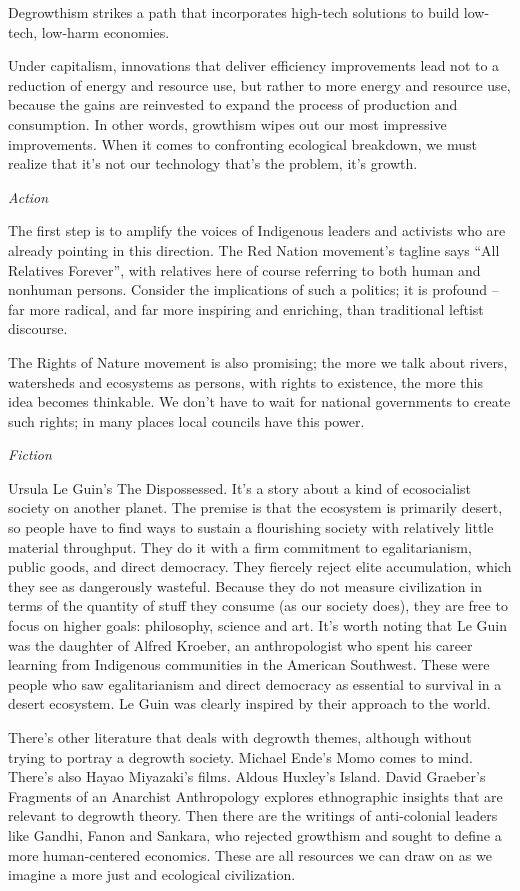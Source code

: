 \documentclass[
]{book}
\begin{document}
Degrowthism strikes a path that incorporates high-tech solutions
to build low-tech, low-harm economies.

Under capitalism, innovations that deliver efficiency improvements lead not to a reduction of energy and resource use, but rather to more energy and resource use, because the gains are reinvested to expand the process of production and consumption. In other words, growthism wipes out our most impressive improvements. When it comes to confronting ecological breakdown, we must realize that it's not our technology that's the problem, it's growth.

\emph{Action}

The first step is to amplify the voices of Indigenous leaders and activists who are already pointing in this direction. The Red Nation movement's tagline says ``All Relatives Forever'', with relatives here of course referring to both human and nonhuman persons. Consider the implications of such a politics; it is profound -- far more radical, and far more inspiring and enriching, than traditional leftist discourse.

The Rights of Nature movement is also promising; the more we talk about rivers, watersheds and ecosystems as persons, with rights to existence, the more this idea becomes thinkable. We don't have to wait for national governments to create such rights; in many places local councils have this power.

\emph{Fiction}

Ursula Le Guin's The Dispossessed. It's a story about a kind of ecosocialist society on another planet. The premise is that the ecosystem is primarily desert, so people have to find ways to sustain a flourishing society with relatively little material throughput. They do it with a firm commitment to egalitarianism, public goods, and direct democracy. They fiercely reject elite accumulation, which they see as dangerously wasteful. Because they do not measure civilization in terms of the quantity of stuff they consume (as our society does), they are free to focus on higher goals: philosophy, science and art. It's worth noting that Le Guin was the daughter of Alfred Kroeber, an anthropologist who spent his career learning from Indigenous communities in the American Southwest. These were people who saw egalitarianism and direct democracy as essential to survival in a desert ecosystem. Le Guin was clearly inspired by their approach to the world.

There's other literature that deals with degrowth themes, although without trying to portray a degrowth society. Michael Ende's Momo comes to mind. There's also Hayao Miyazaki's films. Aldous Huxley's Island. David Graeber's Fragments of an Anarchist Anthropology explores ethnographic insights that are relevant to degrowth theory. Then there are the writings of anti-colonial leaders like Gandhi, Fanon and Sankara, who rejected growthism and sought to define a more human-centered economics. These are all resources we can draw on as we imagine a more just and ecological civilization.
\end{document}
